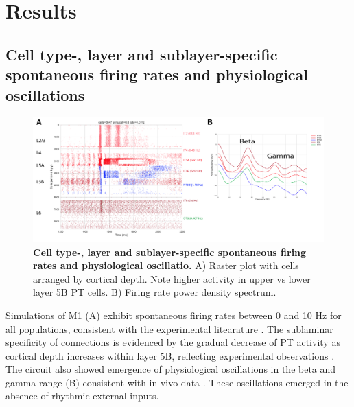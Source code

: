 \section{Results}

\subsection{Cell type-, layer and sublayer-specific spontaneous firing rates and physiological oscillations}
\begin{figure}[!h]  %
\centering
\includegraphics[width=\textwidth]{figs/spont.png}
\caption{{\bf Cell type-, layer and sublayer-specific spontaneous firing rates and physiological oscillatio.}
A) Raster plot with cells arranged by cortical depth. Note higher activity in upper vs lower layer 5B PT cells. 
B) Firing rate power density spectrum.
}
\label{fig_spont}
\end{figure}


Simulations of M1 (A) exhibit spontaneous firing rates between 0 and 10 Hz for all populations, consistent with the experimental litearature \cite{Isom09,LiDa16}. The sublaminar specificity of connections is evidenced by the gradual decrease of PT activity as cortical depth increases within layer 5B, reflecting experimental observations \cite{Ande10}. The circuit also showed emergence of physiological oscillations in the beta and gamma range (B)  consistent with in vivo data \cite{Cast13,Rubi06}. These oscillations emerged in the absence of rhythmic external inputs.

